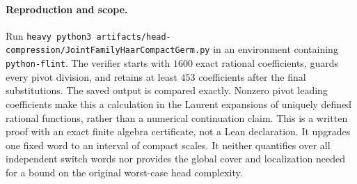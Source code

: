 \documentclass{article}
\begin{document}
\paragraph{Reproduction and scope.}
Run \texttt{heavy python3 artifacts/head-compression/JointFamilyHaarCompactGerm.py}
in an environment containing \texttt{python-flint}. The verifier starts
with $1600$ exact rational coefficients, guards every pivot division,
and retains at least $453$ coefficients after the final substitutions.
The saved output is compared exactly. Nonzero pivot leading coefficients
make this a calculation in the Laurent expansions of uniquely defined
rational functions, rather than a numerical continuation claim.
This is a written proof with an exact finite algebra certificate, not a
Lean declaration. It upgrades one fixed word to an interval of compact
scales. It neither quantifies over all independent switch words nor
provides the global cover and localization needed for a bound on the
original worst-case head complexity.
\end{document}
